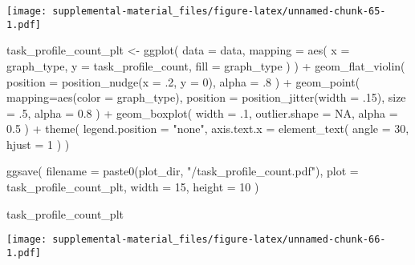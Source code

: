\documentclass[
]{book}
\newenvironment{Shaded}{\begin{snugshade}}{\end{snugshade}}
\newcommand{\AttributeTok}[1]{\textcolor[rgb]{0.77,0.63,0.00}{#1}}
\newcommand{\ConstantTok}[1]{\textcolor[rgb]{0.00,0.00,0.00}{#1}}
\newcommand{\DecValTok}[1]{\textcolor[rgb]{0.00,0.00,0.81}{#1}}
\newcommand{\FloatTok}[1]{\textcolor[rgb]{0.00,0.00,0.81}{#1}}
\newcommand{\FunctionTok}[1]{\textcolor[rgb]{0.00,0.00,0.00}{#1}}
\newcommand{\NormalTok}[1]{#1}
\newcommand{\OtherTok}[1]{\textcolor[rgb]{0.56,0.35,0.01}{#1}}
\newcommand{\SpecialCharTok}[1]{\textcolor[rgb]{0.00,0.00,0.00}{#1}}
\newcommand{\StringTok}[1]{\textcolor[rgb]{0.31,0.60,0.02}{#1}}
\begin{document}
\texttt{[image: supplemental-material\_files/figure-latex/unnamed-chunk-65-1.pdf]}

\begin{Shaded}
\begin{Highlighting}[]
\NormalTok{task\_profile\_count\_plt }\OtherTok{\textless{}{-}} \FunctionTok{ggplot}\NormalTok{(}
    \AttributeTok{data =}\NormalTok{ data,}
    \AttributeTok{mapping =} \FunctionTok{aes}\NormalTok{(}
      \AttributeTok{x =}\NormalTok{ graph\_type,}
      \AttributeTok{y =}\NormalTok{ task\_profile\_count,}
      \AttributeTok{fill =}\NormalTok{ graph\_type}
\NormalTok{    )}
\NormalTok{  ) }\SpecialCharTok{+}
  \FunctionTok{geom\_flat\_violin}\NormalTok{(}
    \AttributeTok{position =} \FunctionTok{position\_nudge}\NormalTok{(}\AttributeTok{x =}\NormalTok{ .}\DecValTok{2}\NormalTok{, }\AttributeTok{y =} \DecValTok{0}\NormalTok{),}
    \AttributeTok{alpha =}\NormalTok{ .}\DecValTok{8}
\NormalTok{  ) }\SpecialCharTok{+}
  \FunctionTok{geom\_point}\NormalTok{(}
    \AttributeTok{mapping=}\FunctionTok{aes}\NormalTok{(}\AttributeTok{color =}\NormalTok{ graph\_type),}
    \AttributeTok{position =} \FunctionTok{position\_jitter}\NormalTok{(}\AttributeTok{width =}\NormalTok{ .}\DecValTok{15}\NormalTok{),}
    \AttributeTok{size =}\NormalTok{ .}\DecValTok{5}\NormalTok{,}
    \AttributeTok{alpha =} \FloatTok{0.8}
\NormalTok{  ) }\SpecialCharTok{+}
  \FunctionTok{geom\_boxplot}\NormalTok{(}
    \AttributeTok{width =}\NormalTok{ .}\DecValTok{1}\NormalTok{,}
    \AttributeTok{outlier.shape =} \ConstantTok{NA}\NormalTok{,}
    \AttributeTok{alpha =} \FloatTok{0.5}
\NormalTok{  ) }\SpecialCharTok{+}
  \FunctionTok{theme}\NormalTok{(}
    \AttributeTok{legend.position =} \StringTok{"none"}\NormalTok{,}
    \AttributeTok{axis.text.x =} \FunctionTok{element\_text}\NormalTok{(}
      \AttributeTok{angle =} \DecValTok{30}\NormalTok{,}
      \AttributeTok{hjust =} \DecValTok{1}
\NormalTok{    )}
\NormalTok{  )}

\FunctionTok{ggsave}\NormalTok{(}
  \AttributeTok{filename =} \FunctionTok{paste0}\NormalTok{(plot\_dir, }\StringTok{"/task\_profile\_count.pdf"}\NormalTok{),}
  \AttributeTok{plot =}\NormalTok{ task\_profile\_count\_plt,}
  \AttributeTok{width =} \DecValTok{15}\NormalTok{,}
  \AttributeTok{height =} \DecValTok{10}
\NormalTok{)}

\NormalTok{task\_profile\_count\_plt}
\end{Highlighting}
\end{Shaded}

\texttt{[image: supplemental-material\_files/figure-latex/unnamed-chunk-66-1.pdf]}
\end{document}
